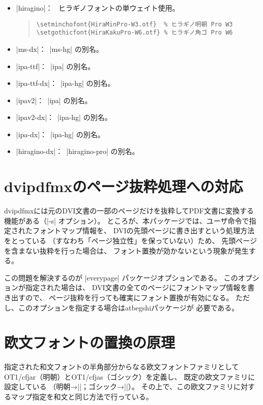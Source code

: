 \documentclass[a4paper,uplatex]{jsarticle}
\newcommand{\Pkg}[1]{\textsf{#1}}
\newcommand{\Means}{：\ }
\begin{document}
\begin{itemize}
\item |hiragino|\Means
  ヒラギノフォントの単ウェイト使用。
\begin{quote}\small\begin{verbatim}
\setminchofont{HiraMinPro-W3.otf}  % ヒラギノ明朝 Pro W3
\setgothicfont{HiraKakuPro-W6.otf} % ヒラギノ角ゴ Pro W6
\end{verbatim}\end{quote}

\item |ms-dx|\Means |ms-hg| の別名。
\item |ipa-ttf|\Means |ipa| の別名。
\item |ipa-ttf-dx|\Means |ipa-hg| の別名。
\item |ipav2|\Means |ipa| の別名。
\item |ipav2-dx|\Means |ipa-hg| の別名。
\item |ipa-dx|\Means |ipa-hg| の別名。
\item |hiragino-dx|\Means |hiragino-pro| の別名。
\end{itemize}

\section{dvipdfmxのページ抜粋処理への対応}

dvipdfmxには元のDVI文書の一部のページだけを抜粋してPDF文書に変換する
機能がある（|-s| オプション）。
ところが、本パッケージでは、ユーザ命令で指定されたフォントマップ情報を、
DVIの先頭ページに書き出すという処理方法をとっている
（すなわち「ページ独立性」を保っていない）ため、
先頭ページを含まない抜粋を行った場合は、
フォント置換が効かないという現象が発生する。

この問題を解決するのが |everypage| パッケージオプションである。
このオプションが指定された場合は、
DVI文書の全てのページにフォントマップ情報を書き出すので、
ページ抜粋を行っても確実にフォント置換が有効になる。
ただし、このオプションを指定する場合は\Pkg{atbegshi}パッケージが
必要である。

\section{欧文フォントの置換の原理}

指定された和文フォントの半角部分からなる欧文フォントファミリとして
OT1/cfjar（明朝）とOT1/cfjas（ゴシック）を定義し、
既定の欧文ファミリに設定している
（明朝→|\rmdefault|；ゴシック→|\sfdefault|）。
その上で、この欧文ファミリに対するマップ指定を和文と同じ方法で行っている。
\end{document}
